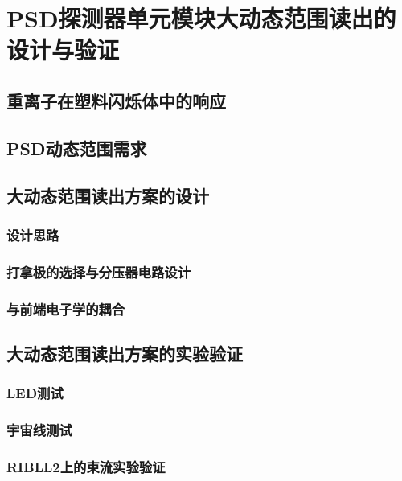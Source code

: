 \chapter{PSD探测器单元模块大动态范围读出的设计与验证}

\section{重离子在塑料闪烁体中的响应}

\section{PSD动态范围需求}

\section{大动态范围读出方案的设计}
\subsection{设计思路}
\subsection{打拿极的选择与分压器电路设计}
\subsection{与前端电子学的耦合}

\section{大动态范围读出方案的实验验证}
\subsection{LED测试}
\subsection{宇宙线测试}
\subsection{RIBLL2上的束流实验验证}